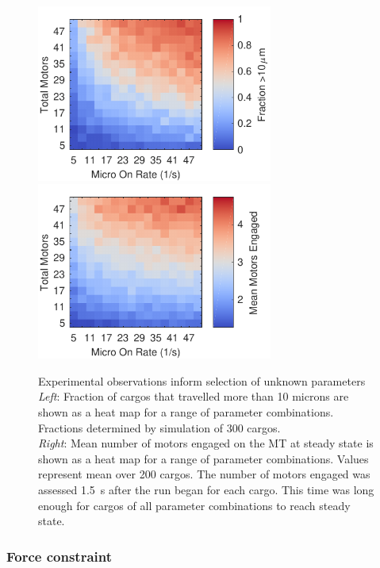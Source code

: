 \begin{figure}
\centering
\includegraphics[width=7.75cm]{appendix1/10micronHeatmap.pdf}
\hspace{.5cm}
\includegraphics[width=7.75cm]{appendix1/n_ss}
\caption[Experimental observations inform selection of unknown parameters]{Experimental observations inform selection of unknown parameters \\
\textit{Left}: Fraction of cargos that travelled more than 10 microns are shown as a heat map for a range of parameter combinations. Fractions determined by simulation of 300 cargos. \\
\textit{Right}: Mean number of motors engaged on the MT at steady state is shown as a heat map for a range of parameter combinations. Values represent mean over 200 cargos. The number of motors engaged was assessed \SI{1.5}{\second} after the run began for each cargo. This time was long enough for cargos of all parameter combinations to reach steady state.}
\label{fig:run_length_fit}
\end{figure}

\subsubsection*{Force constraint}

